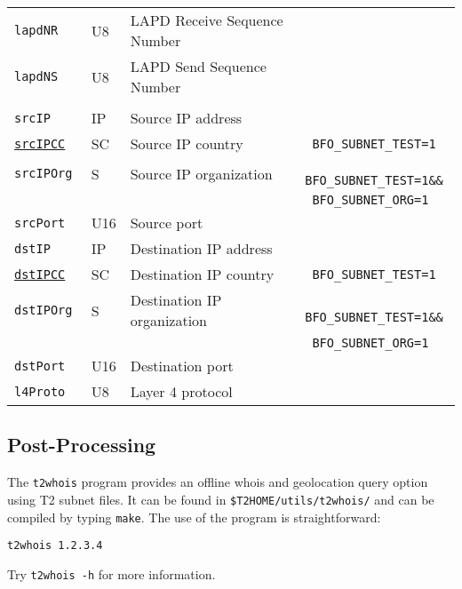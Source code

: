 \documentclass[documentation]{subfiles}
\begin{document}
\begin{longtable}{>{\tt}lll>{\tt\small}l}
    lapdNR                      & U8            & LAPD Receive Sequence Number                       & \\
    lapdNS                      & U8            & LAPD Send Sequence Number                          & \\
    \\
    srcIP                       & IP            & Source IP address                                  & \\
    \hyperref[subnet]{srcIPCC}  & SC            & Source IP country                                  & BFO\_SUBNET\_TEST=1\\
    srcIPOrg                    & S             & Source IP organization                             & BFO\_SUBNET\_TEST=1\&\&\\
                                &               &                                                    & BFO\_SUBNET\_ORG=1\\
    srcPort                     & U16           & Source port                                        & \\
    dstIP                       & IP            & Destination IP address                             & \\
    \hyperref[subnet]{dstIPCC}  & SC            & Destination IP country                             & BFO\_SUBNET\_TEST=1\\
    dstIPOrg                    & S             & Destination IP organization                        & BFO\_SUBNET\_TEST=1\&\&\\
                                &               &                                                    & BFO\_SUBNET\_ORG=1\\
    dstPort                     & U16           & Destination port                                   & \\
    l4Proto                     & U8            & Layer 4 protocol                                   & \\
    \bottomrule
\end{longtable}

\subsection{Post-Processing}
The {\tt t2whois} program provides an offline whois and geolocation query option using T2 subnet files.
It can be found in {\tt\$T2HOME/utils/t2whois/} and can be compiled by typing {\tt make}.
The use of the program is straightforward:
\begin{center}
{\tt t2whois 1.2.3.4}
\end{center}
Try {\tt t2whois -h} for more information.
\end{document}
